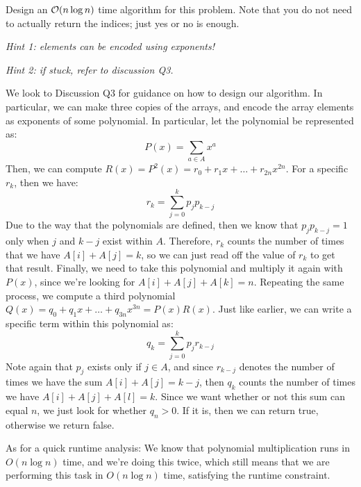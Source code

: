 \documentclass[11pt]{article}
\begin{document}
\noindent Design an $\mathcal{O}(n \log n)$ time algorithm for this problem. Note that you
do not need to actually return the indices; just yes or no is enough. 

\emph{Hint 1: elements can be encoded using exponents!}

\emph{Hint 2: if stuck, refer to discussion Q3.}


\begin{solution}
	We look to Discussion Q3 for guidance on how to design our algorithm. In particular, we can make three 
	copies of the arrays, and encode the array elements as exponents of some polynomial. In particular, 
	let the polynomial be represented as:
	\[
		P(x) = \sum_{a \in A} x^a
	\] 
	Then, we can compute $R(x) = P^2(x) = r_0 + r_1x + \dots + r_{2n}x^{2n}$. For a specific $r_k$, then 
	we have:
	\[
		r_k = \sum_{j = 0}^k p_j p_{k - j}
	\] 
	Due to the way that the polynomials are defined, then we know that $p_j p_{k -j} = 1$ only when $j$ and 
	$k-j$ exist within $A$. Therefore, $r_k$ counts the number of times that we have $A[i] + A[j] = k$, so 
	we can just read off the value of $r_k$ to get that result. Finally, we need to take this 
	polynomial and multiply it again with $P(x)$, since we're looking for $A[i] + A[j] + A[k] = n$. Repeating
	the same process, we compute a third polynomial $Q(x) = q_0 + q_1x + \dots + q_{3n}x^{3n} = P(x) R(x)$. 
	Just like earlier, we can write a specific term within this polynomial as:
	\[
		q_k = \sum_{j = 0}^k p_j r_{k - j}
	\] 
	Note again that $p_j$ exists only if $j \in A$, and since $r_{k - j}$ denotes the number of times we have 
	the sum $A[i] + A[j] = k -j$, then $q_k$ counts the number of times we have $A[i] + A[j] + A[l] = k$. 
	Since we want whether or not this sum can equal $n$, we just look for whether $q_n > 0$. If it is, 
	then we can return true, otherwise we return false. 

	As for a quick runtime analysis: We know that polynomial multiplication runs in $O(n \log n)$ time, and 
	we're doing this twice, which still means that we are performing this task in $O(n \log n)$ time, 
	satisfying the runtime constraint.
\end{solution}
\pagebreak
{}
\end{document}
